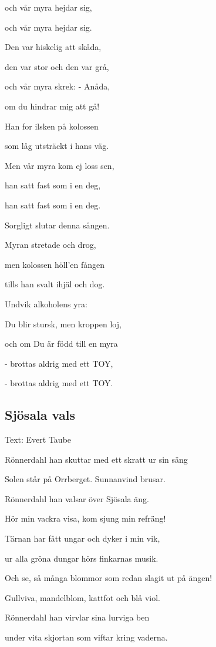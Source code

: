 och vår myra hejdar sig,

och vår myra hejdar sig.\bigskip



Den var hiskelig att skåda,

den var stor och den var grå,

och vår myra skrek: - Anåda,

om du hindrar mig att gå!

Han for ilsken på kolossen

som låg utsträckt i hans väg.

Men vår myra kom ej loss sen,

han satt fast som i en deg,

han satt fast som i en deg. \bigskip



Sorgligt slutar denna sången.

Myran stretade och drog,

men kolossen höll'en fången

tills han svalt ihjäl och dog.

Undvik alkoholens yra:

Du blir stursk, men kroppen loj,

och om Du är född till en myra

- brottas aldrig med ett TOY,

- brottas aldrig med ett TOY. \bigskip


\subsection{\textbf{Sjösala vals}}

Text: Evert Taube\bigskip

Rönnerdahl han skuttar med ett skratt ur sin säng

Solen står på Orrberget. Sunnanvind brusar.

Rönnerdahl han valsar över Sjösala äng.

Hör min vackra visa, kom sjung min refräng!

Tärnan har fått ungar och dyker i min vik,

ur alla gröna dungar hörs finkarnas musik.

Och se, så många blommor som redan slagit ut på ängen!

Gullviva, mandelblom, kattfot och blå viol.\bigskip


Rönnerdahl han virvlar sina lurviga ben

under vita skjortan som viftar kring vaderna.

